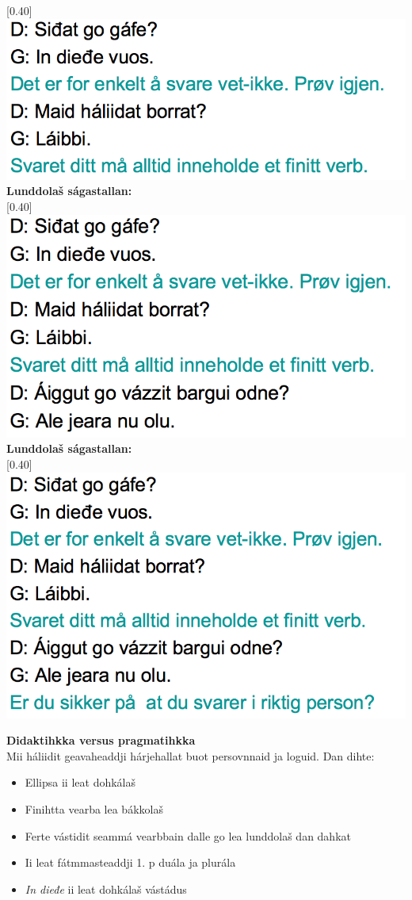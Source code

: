 \documentclass[landscape,norsk,11pt]{seminar}
\begin{document}
\begin{slide}
\scalebox{0.40}[0.40]{\includegraphics{img/lgiella4.png}} 
\newslide
\textbf{Lunddolaš ságastallan:} \\

\scalebox{0.40}[0.40]{\includegraphics{img/lgiella5.png}} 
\newslide
\textbf{Lunddolaš ságastallan:} \\

\scalebox{0.40}[0.40]{\includegraphics{img/lgiella6.png}} 


\newslide
\textbf{Didaktihkka versus pragmatihkka} \\
Mii háliidit geavaheaddji hárjehallat buot persovnnaid ja loguid. Dan dihte:
\begin{itemize}
\item{Ellipsa ii leat dohkálaš}
\item{Finihtta vearba lea bákkolaš}
\item{Ferte vástidit seammá vearbbain dalle go lea lunddolaš dan dahkat}
\item{Ii leat fátmmasteaddji 1. p duála ja plurála }
\item{\textit{In dieđe} ii leat dohkálaš vástádus}
\end{itemize}





\end{slide}
\end{document}
